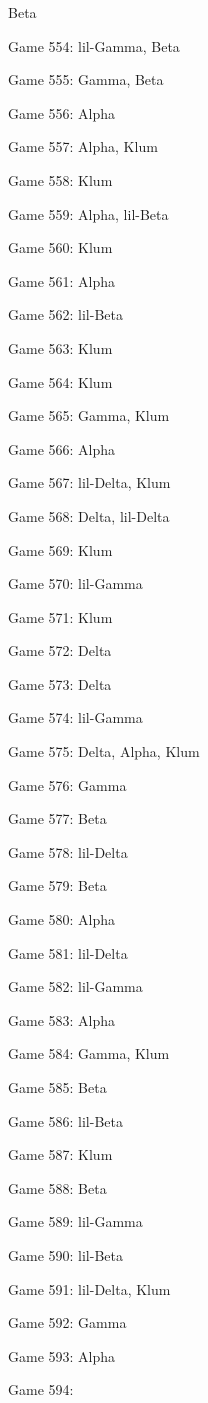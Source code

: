 \documentclass{article}
\begin{document}
\begin{multicols}{3}
\begin{compactitem}
Beta
\item Game 554:
lil-Gamma, Beta
\item Game 555:
Gamma, Beta
\item Game 556:
Alpha
\item Game 557:
Alpha, Klum
\item Game 558:
Klum
\item Game 559:
Alpha, lil-Beta
\item Game 560:
Klum
\item Game 561:
Alpha
\item Game 562:
lil-Beta
\item Game 563:
Klum
\item Game 564:
Klum
\item Game 565:
Gamma, Klum
\item Game 566:
Alpha
\item Game 567:
lil-Delta, Klum
\item Game 568:
Delta, lil-Delta
\item Game 569:
Klum
\item Game 570:
lil-Gamma
\item Game 571:
Klum
\item Game 572:
Delta
\item Game 573:
Delta
\item Game 574:
lil-Gamma
\item Game 575:
Delta, Alpha, Klum
\item Game 576:
Gamma
\item Game 577:
Beta
\item Game 578:
lil-Delta
\item Game 579:
Beta
\item Game 580:
Alpha
\item Game 581:
lil-Delta
\item Game 582:
lil-Gamma
\item Game 583:
Alpha
\item Game 584:
Gamma, Klum
\item Game 585:
Beta
\item Game 586:
lil-Beta
\item Game 587:
Klum
\item Game 588:
Beta
\item Game 589:
lil-Gamma
\item Game 590:
lil-Beta
\item Game 591:
lil-Delta, Klum
\item Game 592:
Gamma
\item Game 593:
Alpha
\item Game 594:

\end{compactitem}
\end{multicols}
\end{document}
